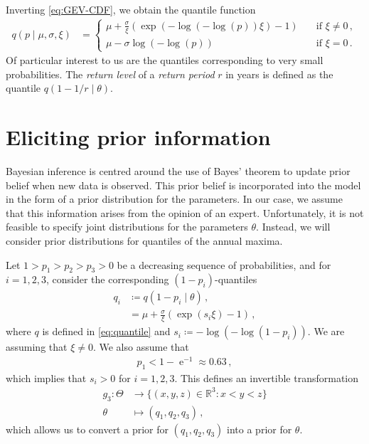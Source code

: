 \documentclass{article}
\newcommand{\R}{\mathbb{R}}
\begin{document}
%
Inverting \eqref{eq:GEV-CDF}, we obtain the quantile function
%
\begin{align}
	q(p \mid \mu, \sigma, \xi) &=
	\begin{cases}
		\mu + \frac{\sigma}{\xi} (\exp(-\log(-\log(p)) \xi) - 1)
			&\quad \text{if $\xi \neq 0$}\,,\\
		\mu - \sigma \log(-\log(p))
			&\quad \text{if $\xi = 0$} \,.
	\end{cases}
	\label{eq:quantile}
\end{align}
%
Of particular interest to us are the quantiles
corresponding to very small probabilities.
The \textit{return level} of a \textit{return period} $r$ in years
is defined as the quantile $q(1 - 1 / r\mid \theta)$.
%
\section{Eliciting prior information}
\label{section:priors}
%
Bayesian inference is centred around the use of Bayes' theorem
to update prior belief when new data is observed.
This prior belief is incorporated
into the model in the form of a prior distribution for the parameters.
In our case, we assume that this information
arises from the opinion of an expert.
Unfortunately, it is not feasible to specify joint distributions
for the parameters $\theta$.
Instead, we will consider prior distributions
for quantiles of the annual maxima.
%

%
Let $1 > p_1 > p_2 > p_3 > 0$ be a decreasing sequence of probabilities,
and for $i = 1, 2, 3$, consider the corresponding $(1 - p_i)$-quantiles
%
\begin{align}
	q_i &\coloneqq q(1 - p_i \mid \theta) \,, \nonumber \\
	&= \mu + \frac{\sigma}{\xi} (\exp(s_i \xi) - 1) \,,
	\label{eq:q_i}
\end{align}
%
where $q$ is defined in \eqref{eq:quantile}
and $s_i \coloneqq -\log(-\log(1 - p_i))$.
We are assuming that $\xi \neq 0$.
We also assume that
%
\begin{align*}
	p_1 < 1 - \operatorname{e} ^ {-1} \approx 0.63 \,,
\end{align*}
%
which implies that $s_i > 0$ for $i = 1, 2, 3$.
This defines an invertible transformation
%
\begin{align*}
	g_3 \colon \Theta &\to \{(x, y, z) \in \R^3 \colon x < y < z\} \\
	\theta &\mapsto (q_{1}, q_{2}, q_{3}) \,,
\end{align*}
%
which allows us to convert a prior for $(q_1, q_2, q_3)$
into a prior for $\theta$.
%
\end{document}
